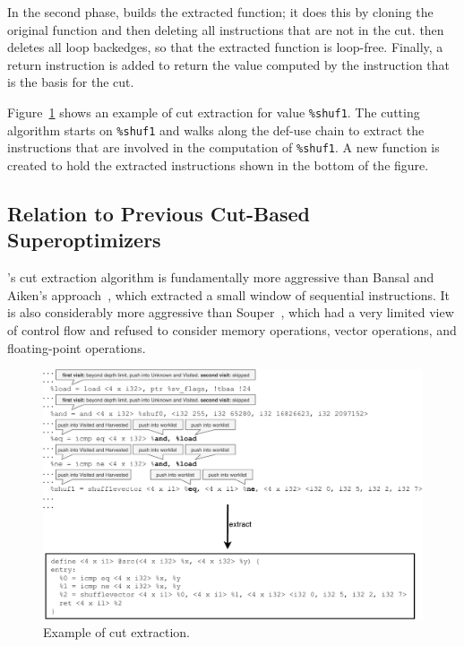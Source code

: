 In the second phase, \minotaur{} builds the extracted function; it does
this by cloning the original function and then deleting all
instructions that are not in the cut.
%
\minotaur{} then deletes all loop backedges, so that the extracted
function is loop-free.
%
Finally, a return instruction is added to return the value computed by
the instruction that is the basis for the cut.



Figure~\ref{fig:cut} shows an example of cut extraction
for value \texttt{\%shuf1}.
%
The cutting algorithm starts on \texttt{\%shuf1} and walks along the
def-use chain to extract the instructions that are involved in the
computation of \texttt{\%shuf1}.
%
A new function is created to hold the extracted instructions shown
in the bottom of the figure.



\subsection{Relation to Previous Cut-Based Superoptimizers}

\minotaur's cut extraction algorithm is fundamentally more aggressive
than Bansal and Aiken's approach~\cite{Bansal06}, which extracted a
small window of sequential instructions.
%
It is also considerably more aggressive than Souper~\cite{souper},
which had a very limited view of control flow and refused to consider
memory operations, vector operations, and floating-point operations.

\begin{figure}[tbp]
  \centering
  \includegraphics[width=0.95\linewidth]{figures/slice.pdf}
  \caption{Example of cut extraction.}
  \label{fig:cut}
\end{figure}

